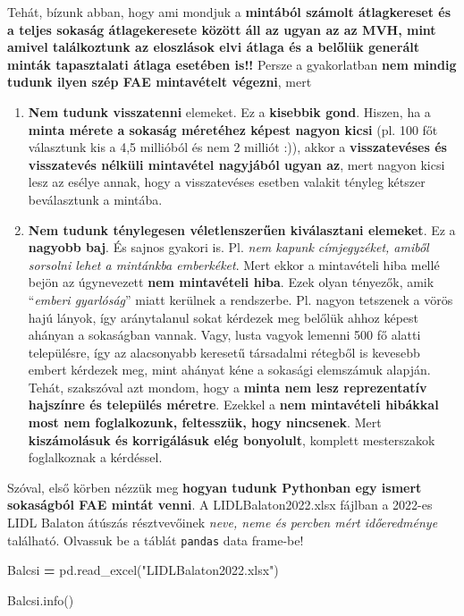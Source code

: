 \documentclass[
]{book}
\newenvironment{Shaded}{\begin{snugshade}}{\end{snugshade}}
\newcommand{\NormalTok}[1]{#1}
\newcommand{\OperatorTok}[1]{\textcolor[rgb]{0.81,0.36,0.00}{\textbf{#1}}}
\newcommand{\StringTok}[1]{\textcolor[rgb]{0.31,0.60,0.02}{#1}}
\providecommand{\tightlist}{%
  \setlength{\itemsep}{0pt}\setlength{\parskip}{0pt}}
\begin{document}
Tehát, bízunk abban, hogy ami mondjuk a \textbf{mintából számolt átlagkereset és a teljes sokaság átlagekeresete között áll az ugyan az az MVH, mint amivel találkoztunk az eloszlások elvi átlaga és a belőlük generált minták tapasztalati átlaga esetében is!!}
Persze a gyakorlatban \textbf{nem mindig tudunk ilyen szép FAE mintavételt végezni}, mert

\begin{enumerate}
\def\labelenumi{\arabic{enumi}.}
\tightlist
\item
  \textbf{Nem tudunk visszatenni} elemeket. Ez a \textbf{kisebbik gond}. Hiszen, ha a \textbf{minta mérete a sokaság méretéhez képest nagyon kicsi} (pl. 100 főt választunk kis a 4,5 millióból és nem 2 milliót :)), akkor a \textbf{visszatevéses és visszatevés nélküli mintavétel nagyjából ugyan az}, mert nagyon kicsi lesz az esélye annak, hogy a visszatevéses esetben valakit tényleg kétszer beválasztunk a mintába.
\item
  \textbf{Nem tudunk ténylegesen véletlenszerűen kiválasztani elemeket}. Ez a \textbf{nagyobb baj}. És sajnos gyakori is. Pl. \emph{nem kapunk címjegyzéket, amiből sorsolni lehet a mintánkba emberkéket}. Mert ekkor a mintavételi hiba mellé bejön az úgynevezett \textbf{nem mintavételi hiba}. Ezek olyan tényezők, amik ``\emph{emberi gyarlóság}'' miatt kerülnek a rendszerbe. Pl. nagyon tetszenek a vörös hajú lányok, így aránytalanul sokat kérdezek meg belőlük ahhoz képest ahányan a sokaságban vannak. Vagy, lusta vagyok lemenni 500 fő alatti településre, így az alacsonyabb keresetű társadalmi rétegből is kevesebb embert kérdezek meg, mint ahányat kéne a sokasági elemszámuk alapján. Tehát, szakszóval azt mondom, hogy a \textbf{minta nem lesz reprezentatív hajszínre és település méretre}. Ezekkel a \textbf{nem mintavételi hibákkal most nem foglalkozunk, feltesszük, hogy nincsenek}. Mert \textbf{kiszámolásuk és korrigálásuk elég bonyolult}, komplett mesterszakok foglalkoznak a kérdéssel.
\end{enumerate}

Szóval, első körben nézzük meg \textbf{hogyan tudunk Pythonban egy ismert sokaságból FAE mintát venni}. A LIDLBalaton2022.xlsx fájlban a 2022-es LIDL Balaton átúszás résztvevőinek \emph{neve, neme és percben mért időeredménye} található. Olvassuk be a táblát \texttt{pandas} data frame-be!

\begin{Shaded}
\begin{Highlighting}[]
\NormalTok{Balcsi }\OperatorTok{=}\NormalTok{ pd.read\_excel(}\StringTok{"LIDLBalaton2022.xlsx"}\NormalTok{)}

\NormalTok{Balcsi.info()}
\end{Highlighting}
\end{Shaded}
\end{document}
